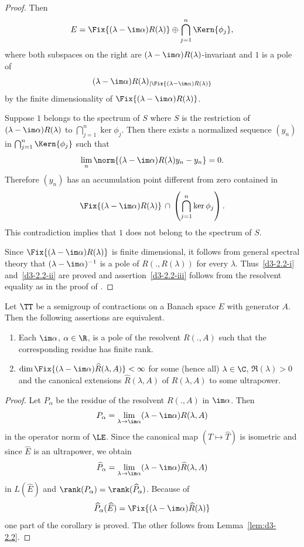 \begin{proof}
Then
\[
E = \Fix{(\lambda - \im\alpha)R(\lambda)} \oplus \bigcap_{j=1}^{n} \Kern{\phi_{j}},
\]
where both subspaces on the right are 
$(\lambda - \im\alpha)R(\lambda)$-invariant and $1$ is a pole of 
\[
(\lambda-\im\alpha)R(\lambda)_{\vert \Fix{ (\lambda-\im\alpha) R(\lambda)}}
\]
by the finite dimensionality of\/ $\Fix{(\lambda - \im\alpha)R(\lambda)}$.

Suppose $1$ belongs to the spectrum of\/ $S$ where $S$ is the restriction of 
$(\lambda-\im\alpha)R(\lambda)$ to $\bigcap_{j=1}^{n} \ker\phi_{j}$.
Then there exists a normalized sequence $(y_{n})$ in 
$\bigcap_{j=1}^{n} \Kern{\phi_{j}}$ such that
\[
\lim_{n} \norm{(\lambda - \im\alpha)R(\lambda)y_{n} - y_{n}} = 0 .
\]
Therefore $(y_{n})$ has an accumulation point different from zero contained in
\[
\Fix{(\lambda - \im\alpha)R(\lambda)} \, \cap \,\left( \bigcap_{j=1}^{n} \ker\phi_{j} \right) .
\]
This contradiction implies that $1$ does not belong to the spectrum of\/ $S$.

Since $\Fix{(\lambda - \im\alpha)R(\lambda)}$ is finite dimensional, it follows from general spectral theory that $(\lambda - \im\alpha)^{-1}$ is a pole of\/ $R(.,R(\lambda))$ for every $\lambda$.
Thus~\ref{d3-2.2-i} and~\ref{d3-2.2-ii} are proved and assertion~\ref{d3-2.2-iii} follows from the resolvent equality as in the proof of \textcite[Proposition 1.2]{greiner:1981}.
\end{proof}
\begin{proposition}\label{prop:d3-2.3}
Let $\TT$ be a semigroup of contractions on a Banach space $E$ with generator $A$.
Then the following assertions are equivalent.
\begin{enumerate}[\upshape (a)]

\item
Each $\im\alpha$, $\alpha \in \R$, is a pole of the resolvent $R(.,A)$ such that the corresponding residue has finite rank.

\item
$\dim \Fix{(\lambda - \im\alpha)\widehat{R}(\lambda,A)} < \infty$ for some (hence all) $\lambda \in \C$, $\Re(\lambda) > 0$ and the canonical extensions $\widehat{R}(\lambda,A)$ of\/ $R(\lambda,A)$ to some ultrapower.

\end{enumerate}
\end{proposition}
\begin{proof}
Let $P_{\alpha}$ be the residue of the resolvent $R(.,A)$ in $\im\alpha$.
Then 
\[
P_{\alpha} = \lim_{\lambda \to \im\alpha}(\lambda - \im\alpha)R(\lambda,A)
\]
in the operator norm of\/ $\LE$.
Since the canonical map $(T \mapsto \widehat{T})$ is isometric and since $\widehat{E}$ is an ultrapower, we obtain
\[
\widehat{P}_{\alpha} = \lim_{\lambda \to \im\alpha}(\lambda - \im\alpha)\widehat{R}(\lambda,A)
\]
in $L(\widehat{E})$ and $\rank(P_{\alpha}) = \rank(\widehat{P}_{\alpha})$.
Because of
\[
\widehat{P}_{\alpha}(\widehat{E}) = \Fix  {(\lambda-\im\alpha)\widehat{R}(\lambda)}
\]
one part of the corollary is proved. The other follows from Lemma~\ref{lem:d3-2.2}.
\end{proof}

